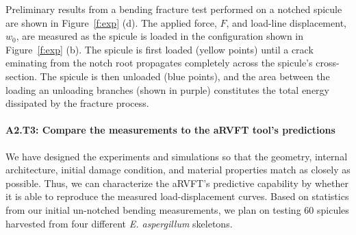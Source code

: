 \documentclass[10pt,letterpaper]{article}
\begin{document}
      Preliminary results from a bending fracture test performed on a notched spicule are shown in Figure~\ref{f:exp} (d). The applied force, $F$, and load-line displacement, $w_0$, are measured as the spicule is loaded in the configuration shown in Figure~\ref{f:exp} (b). The spicule is first loaded (yellow points) until a crack eminating from the notch root propagates completely across the spicule's cross-section. The spicule is then unloaded (blue points), and the area between the loading an unloading branches (shown in purple) constitutes the total energy dissipated by the fracture process.

    \paragraph{A2.T3: Compare the measurements to the aRVFT tool's predictions}
      We have designed the experiments and simulations so that the geometry, internal architecture, initial damage condition, and material properties match as closely as possible. Thus, we can characterize the aRVFT's predictive capability by whether it is able to reproduce the measured load-displacement curves. Based on statistics from our initial un-notched bending measurements, we plan on testing 60 spicules harvested from four different \textit{E. aspergillum} skeletons.

\end{document}
